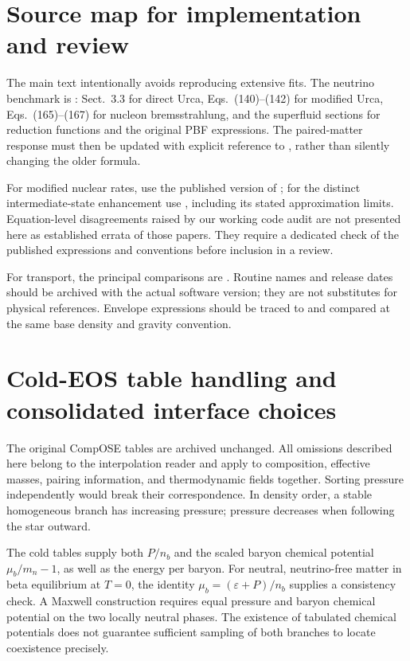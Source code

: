\documentclass{aa}
\begin{document}
\begin{appendix}
\section{Source map for implementation and review}
\label{app:sources}
The main text intentionally avoids reproducing extensive fits. The neutrino benchmark is \citet{Yakovlev2001}: Sect.~3.3 for direct Urca, Eqs.~(140)--(142) for modified Urca, Eqs.~(165)--(167) for nucleon bremsstrahlung, and the superfluid sections for reduction functions and the original PBF expressions. The paired-matter response must then be updated with explicit reference to \citet{Leinson2006,Page2009,Leinson2010}, rather than silently changing the older formula.

For modified nuclear rates, use the published version of \citet{Bottaro2024}; for the distinct intermediate-state enhancement use \citet{Shternin2018}, including its stated approximation limits. Equation-level disagreements raised by our working code audit are not presented here as established errata of those papers. They require a dedicated check of the published expressions and conventions before inclusion in a review.

For transport, the principal comparisons are \citet{Potekhin1999,Shternin2006,Shternin2007,Baiko2001}. Routine names and release dates should be archived with the actual software version; they are not substitutes for physical references. Envelope expressions should be traced to \citet{Gudmundsson1983,Potekhin1997,Beznogov2016,Beznogov2021} and compared at the same base density and gravity convention.


\section{Cold-EOS table handling and consolidated interface choices}
\label{app:eos-tables}
The original CompOSE tables are archived unchanged. All omissions described here belong to the interpolation reader and apply to composition, effective masses, pairing information, and thermodynamic fields together. Sorting pressure independently would break their correspondence. In density order, a stable homogeneous branch has increasing pressure; pressure decreases when following the star outward.

The cold tables supply both $P/n_b$ and the scaled baryon chemical potential $\mu_b/m_n-1$, as well as the energy per baryon. For neutral, neutrino-free matter in beta equilibrium at $T=0$, the identity $\mu_b=(\varepsilon+P)/n_b$ supplies a consistency check. A Maxwell construction requires equal pressure and baryon chemical potential on the two locally neutral phases. The existence of tabulated chemical potentials does not guarantee sufficient sampling of both branches to locate coexistence precisely.


\end{appendix}
\end{document}
